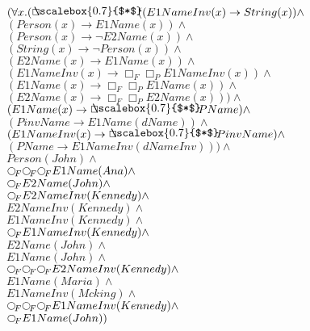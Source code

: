\documentclass[a4paper,10pt]{article}
\begin{document}
 \newcommand{\nxt}{{\ensuremath\raisebox{0.25ex}{\text{\scriptsize$\bigcirc$}}}}
\newcommand{\Rdiamond}{\Diamond_{\!F}}
\newcommand{\Rbox}{\Box_{\!F}}
\newcommand{\Rnext}{\nxt_{\!F}}
\newcommand{\Ldiamond}{\Diamond_{\!P}}
\newcommand{\Lbox}{\Box_{\!P}}
\newcommand{\Lnext}{\nxt_{\!P}}
\newcommand{\SVdiamond}{\mathop{\ooalign{$\Diamond$ \cr \kern0.5ex
    \raisebox{0.35ex}{\scalebox{0.7}{$*$}}} \kern-0.9ex}}
\newcommand{\SVbox}{\mathop{\ooalign{$\Box$ \cr \kern0.42ex
    \raisebox{0.3ex}{\scalebox{0.7}{$*$}}} \kern-0.9ex}}


$( \forall x. ( \SVbox ((E1NameInv(x) \rightarrow String(x)) \land $ \\ 
 $ (Person(x) \rightarrow E1Name(x)) \land $ \\ 
 $ (Person(x) \rightarrow  \lnot E2Name(x)) \land $ \\ 
 $ (String(x) \rightarrow  \lnot Person(x)) \land $ \\ 
 $ (E2Name(x) \rightarrow E1Name(x)) \land $ \\ 
 $ (E1NameInv(x) \rightarrow  \Rbox  \Lbox E1NameInv(x)) \land $ \\ 
 $ (E1Name(x) \rightarrow  \Rbox  \Lbox E1Name(x)) \land $ \\ 
 $ (E2Name(x) \rightarrow  \Rbox  \Lbox E2Name(x))) \land $ \\ 
 $ (E1Name(x) \rightarrow  \SVbox PName) \land $ \\ 
 $ (PinvName \rightarrow E1Name(dName)) \land $ \\ 
 $ (E1NameInv(x) \rightarrow  \SVbox PinvName) \land $ \\ 
 $ (PName \rightarrow E1NameInv(dNameInv))) \land $ \\ 
 $ Person(John) \land $ \\ 
 $  \Rnext  \Rnext  \Rnext E1Name(Ana) \land $ \\ 
 $  \Rnext E2Name(John) \land $ \\ 
 $  \Rnext E2NameInv(Kennedy) \land $ \\ 
 $ E2NameInv(Kennedy) \land $ \\ 
 $ E1NameInv(Kennedy) \land $ \\ 
 $  \Rnext E1NameInv(Kennedy) \land $ \\ 
 $ E2Name(John) \land $ \\ 
 $ E1Name(John) \land $ \\ 
 $  \Rnext  \Rnext  \Rnext E2NameInv(Kennedy) \land $ \\ 
 $ E1Name(Maria) \land $ \\ 
 $ E1NameInv(Mcking) \land $ \\ 
 $  \Rnext  \Rnext  \Rnext E1NameInv(Kennedy) \land $ \\ 
 $  \Rnext E1Name(John))$ 
\end{document}
